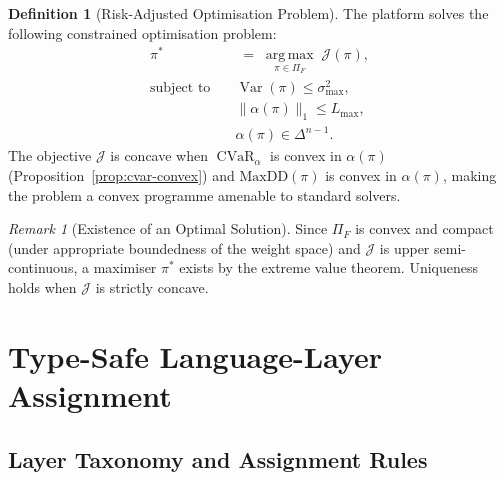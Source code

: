 \documentclass[12pt,openany]{book}
\newcommand{\MaxDD}{\mathrm{MaxDD}}
\numberwithin{equation}{chapter}
\theoremstyle{plain}
\theoremstyle{definition}
\newtheorem{definition}[theorem]{Definition}
\theoremstyle{remark}
\newtheorem{remark}[theorem]{Remark}
\numberwithin{equation}{chapter}
\theoremstyle{plain}
\DeclareMathOperator{\CVaR}{CVaR}
\DeclareMathOperator{\Var}{Var}
\begin{document}
\begin{definition}[Risk-Adjusted Optimisation Problem]
\label{def:opt-problem}
The platform solves the following constrained optimisation problem:
\begin{align}
  \pi^*
  &\;=\;
  \operatorname*{arg\,max}_{\pi \in \Pi_F}\;
  \mathcal{J}(\pi),
  \label{eq:opt-problem} \\[4pt]
  \text{subject to}\quad
  &\Var(\pi) \leq \sigma_{\max}^2,
  \label{eq:opt-c1} \\
  &\|\alpha(\pi)\|_1 \leq L_{\max},
  \label{eq:opt-c2} \\
  &\alpha(\pi) \in \Delta^{n-1}.
  \label{eq:opt-c3}
\end{align}
The objective $\mathcal{J}$ is concave when $\CVaR_\alpha$ is convex
in $\alpha(\pi)$ (Proposition~\ref{prop:cvar-convex}) and
$\MaxDD(\pi)$ is convex in $\alpha(\pi)$, making the problem a
convex programme amenable to standard solvers.
\end{definition}

\begin{remark}[Existence of an Optimal Solution]
\label{rem:opt-existence}
Since $\Pi_F$ is convex and compact (under appropriate boundedness of
the weight space) and $\mathcal{J}$ is upper semi-continuous, a
maximiser $\pi^*$ exists by the extreme value theorem.  Uniqueness
holds when $\mathcal{J}$ is strictly concave.
\end{remark}

\chapter{Type-Safe Language-Layer Assignment}
\label{ch:languages}

\section{Layer Taxonomy and Assignment Rules}
\label{sec:lang-taxonomy}
\end{document}
